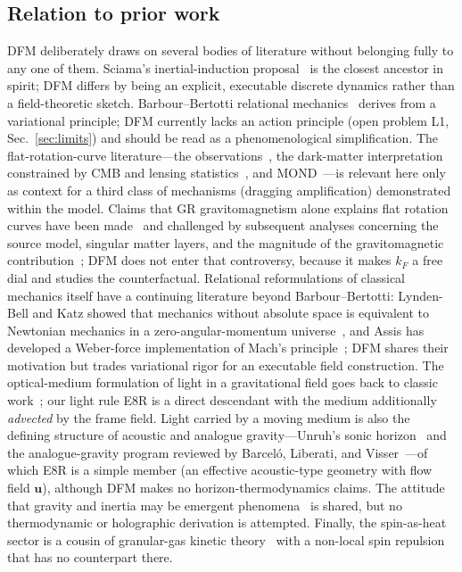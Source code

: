 \documentclass[aps,reprint,amsmath,amssymb,nofootinbib,superscriptaddress,floatfix]{revtex4-2}
\newcommand{\vect}[1]{\bm{#1}}
\begin{document}
\subsection{Relation to prior work}
\label{sec:prior}

DFM deliberately draws on several bodies of literature without
belonging fully to any one of them.
Sciama's inertial-induction proposal~\cite{Sciama1953} is the closest
ancestor in spirit; DFM differs by being an explicit, executable
discrete dynamics rather than a field-theoretic sketch.
Barbour--Bertotti relational mechanics~\cite{BarbourBertotti1982}
derives from a variational principle; DFM currently lacks an action
principle (open problem L1, Sec.~\ref{sec:limits}) and should be read
as a phenomenological simplification.
The flat-rotation-curve literature---the observations~\cite{RubinFord1970},
the dark-matter interpretation constrained by CMB and lensing
statistics~\cite{Planck2018}, and MOND~\cite{Milgrom1983}---is
relevant here only as context for a third class of mechanisms
(dragging amplification) demonstrated within the model.
Claims that GR gravitomagnetism alone explains flat rotation curves
have been made~\cite{CooperstockTieu2005,Ludwig2021} and challenged
by subsequent analyses concerning the source model, singular matter
layers, and the magnitude of the gravitomagnetic
contribution~\cite{FuchsPhleps2006,Korzynski2007,LasenbyHobsonBarker2023};
DFM does not enter that controversy, because it makes $k_F$ a free
dial and studies the counterfactual.
Relational reformulations of classical mechanics itself have a
continuing literature beyond Barbour--Bertotti: Lynden-Bell and Katz
showed that mechanics without absolute space is equivalent to Newtonian
mechanics in a zero-angular-momentum universe~\cite{LyndenBellKatz1995},
and Assis has developed a Weber-force implementation of Mach's
principle~\cite{Assis1999}; DFM shares their motivation but trades
variational rigor for an executable field construction.
The optical-medium formulation of light in a gravitational field goes
back to classic work~\cite{deFelice1971}; our light rule E8R is a
direct descendant with the medium additionally \emph{advected} by the
frame field.
Light carried by a moving medium is also the defining structure of
acoustic and analogue gravity---Unruh's sonic horizon~\cite{Unruh1981}
and the analogue-gravity program reviewed by Barcel\'o, Liberati, and
Visser~\cite{BarceloLiberatiVisser2005}---of which E8R is a simple
member (an effective acoustic-type geometry with flow field $\vect{u}$),
although DFM makes no horizon-thermodynamics claims.
The attitude that gravity and inertia may be emergent
phenomena~\cite{Verlinde2017} is shared, but no thermodynamic or
holographic derivation is attempted.
Finally, the spin-as-heat sector is a cousin of granular-gas kinetic
theory~\cite{BrilliantovPoschel2004} with a non-local spin repulsion
that has no counterpart there.
\end{document}
